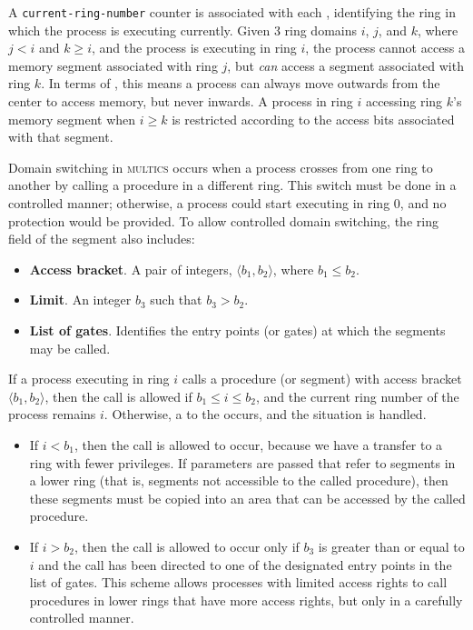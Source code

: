A \texttt{current-ring-number} counter is associated with each , identifying the ring in which the process is executing currently.
Given 3 ring domains $i$, $j$, and $k$, where $j < i$ and $k \geq i$, and the process is executing in ring $i$, the process cannot access a memory segment associated with ring $j$, but \emph{can} access a segment associated with ring $k$.
In terms of , this means a process can always move outwards from the center to access memory, but never inwards.
A process in ring $i$ accessing ring $k$'s memory segment when $i \geq k$ is restricted according to the access bits associated with that segment.

Domain switching in \textsc{multics} occurs when a process crosses from one ring to another by calling a procedure in a different ring.
This switch must be done in a controlled manner; otherwise, a process could start executing in ring $0$, and no protection would be provided.
To allow controlled domain switching, the ring field of the segment also includes:
\begin{itemize}[noitemsep]
\item \textbf{Access bracket}.
  A pair of integers, $\langle b_{1}, b_{2} \rangle$, where $b_{1} \leq b_{2}$.
\item \textbf{Limit}.
  An integer $b_{3}$ such that $b_{3} > b_{2}$.
\item \textbf{List of gates}.
  Identifies the entry points (or gates) at which the segments may be called.
\end{itemize}

If a process executing in ring $i$ calls a procedure (or segment) with access bracket $\langle b_{1}, b_{2} \rangle$, then the call is allowed if $b_{1} \leq i \leq b_{2}$, and the current ring number of the process remains $i$.
Otherwise, a  to the  occurs, and the situation is handled.
\begin{itemize}[noitemsep]
\item If $i < b_{1}$, then the call is allowed to occur, because we have a transfer to a ring with fewer privileges.
  If parameters are passed that refer to segments in a lower ring (that is, segments not accessible to the called procedure), then these segments must be copied into an area that can be accessed by the called procedure.
\item If $i > b_{2}$, then the call is allowed to occur only if $b_{3}$ is greater than or equal to $i$ and the call has been directed to one of the designated entry points in the list of gates.
  This scheme allows processes with limited access rights to call procedures in lower rings that have more access rights, but only in a carefully controlled manner.
\end{itemize}

